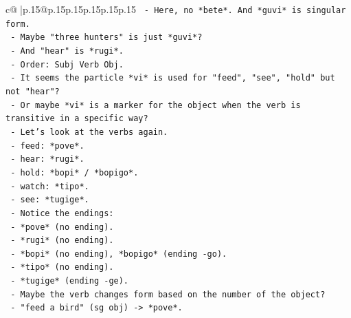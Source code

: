 \documentclass{article}
\begin{document}
{\begin{supertabular}{c@{$\;$}|p{.15\linewidth}@{}p{.15\linewidth}p{.15\linewidth}p{.15\linewidth}p{.15\linewidth}p{.15\linewidth}}
{{{\texttt{                                             {-} Here, no *bete*. And *guvi* is singular form.} \\
\texttt{                                             {-} Maybe "three hunters" is just *guvi*?} \\
\texttt{                                             {-} And "hear" is *rugi*.} \\
\texttt{                                             {-} Order: Subj Verb Obj.} \\
\texttt{                                         {-} It seems the particle *vi* is used for "feed", "see", "hold" but not "hear"?} \\
\texttt{                                         {-} Or maybe *vi* is a marker for the object when the verb is transitive in a specific way?} \\
\texttt{                                         {-} Let's look at the verbs again.} \\
\texttt{                                           {-} feed: *pove*.} \\
\texttt{                                           {-} hear: *rugi*.} \\
\texttt{                                           {-} hold: *bopi* / *bopigo*.} \\
\texttt{                                           {-} watch: *tipo*.} \\
\texttt{                                           {-} see: *tugige*.} \\
\texttt{                                         {-} Notice the endings:} \\
\texttt{                                           {-} *pove* (no ending).} \\
\texttt{                                           {-} *rugi* (no ending).} \\
\texttt{                                           {-} *bopi* (no ending), *bopigo* (ending {-}go).} \\
\texttt{                                           {-} *tipo* (no ending).} \\
\texttt{                                           {-} *tugige* (ending {-}ge).} \\
\texttt{                                         {-} Maybe the verb changes form based on the number of the object?} \\
\texttt{                                           {-} "feed a bird" (sg obj) {-}> *pove*.} \\
}}}
\end{supertabular}}
\end{document}
